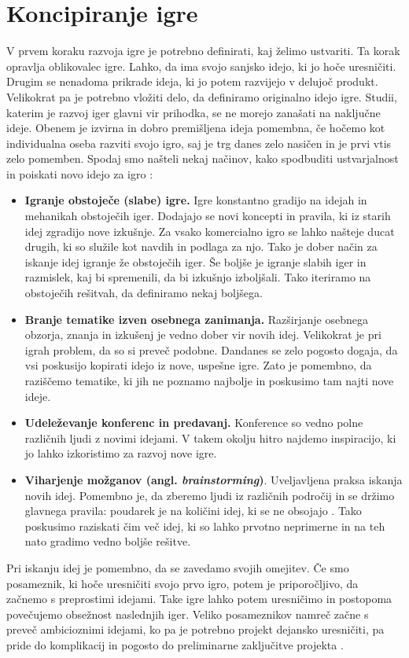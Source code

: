 \documentclass[12pt,a4paper,twoside]{book}
\begin{document}
\section{Koncipiranje igre}
V prvem koraku razvoja igre je potrebno definirati, kaj želimo ustvariti. Ta korak opravlja oblikovalec igre. Lahko, da ima svojo sanjsko idejo, ki jo hoče uresničiti. Drugim se nenadoma prikrade ideja, ki jo potem razvijejo v delujoč produkt. Velikokrat pa je potrebno vložiti delo, da definiramo originalno idejo igre. Studii, katerim je razvoj iger glavni vir prihodka, se ne morejo zanašati na naključne ideje. Obenem je izvirna in dobro premišljena ideja pomembna, če hočemo kot individualna oseba razviti svojo igro, saj je trg danes zelo nasičen in je prvi vtis zelo pomemben. Spodaj smo našteli nekaj načinov, kako spodbuditi ustvarjalnost in poiskati novo idejo za igro \cite{rogers2014level}: 
\begin{itemize}
	\item \textbf{Igranje obstoječe (slabe) igre.} Igre konstantno gradijo na idejah in mehanikah obstoječih iger. Dodajajo se novi koncepti in pravila, ki iz starih idej zgradijo nove izkušnje. Za vsako komercialno igro se lahko našteje ducat drugih, ki so služile kot navdih in podlaga za njo. Tako je dober način za iskanje idej igranje že obstoječih iger. Še boljše je igranje slabih iger in razmislek, kaj bi spremenili, da bi izkušnjo izboljšali. Tako iteriramo na obstoječih rešitvah, da definiramo nekaj boljšega.
	\item \textbf{Branje tematike izven osebnega zanimanja.} Razširjanje osebnega obzorja, znanja in izkušenj je vedno dober vir novih idej. Velikokrat je pri igrah problem, da so si preveč podobne. Dandanes se zelo pogosto dogaja, da vsi poskusijo kopirati idejo iz nove, uspešne igre. Zato je pomembno, da raziščemo tematike, ki jih ne poznamo najbolje in poskusimo tam najti nove ideje.
	\item \textbf{Udeleževanje konferenc in predavanj.} Konference so vedno polne različnih ljudi z novimi idejami. V takem okolju hitro najdemo inspiracijo, ki jo lahko izkoristimo za razvoj nove igre.
	\item \textbf{Viharjenje možganov (angl. \textit{brainstorming})}. Uveljavljena praksa iskanja novih idej. Pomembno je, da zberemo ljudi iz različnih področij in se držimo glavnega pravila: poudarek je na količini idej, ki se ne obsojajo \cite{osborn1953applied}. Tako poskusimo raziskati čim več idej, ki so lahko prvotno neprimerne in na teh nato gradimo vedno boljše rešitve.
\end{itemize}
Pri iskanju idej je pomembno, da se zavedamo svojih omejitev. Če smo posameznik, ki hoče uresničiti svojo prvo igro, potem je priporočljivo, da začnemo s preprostimi idejami. Take igre lahko potem uresničimo in postopoma povečujemo obsežnost naslednjih iger. Veliko posameznikov namreč začne s preveč ambicioznimi idejami, ko pa je potrebno projekt dejansko uresničiti, pa pride do komplikacij in pogosto do preliminarne zaključitve projekta \cite{ambitious1}\cite{ambitious2}\cite{ambitious3}.
\end{document}
